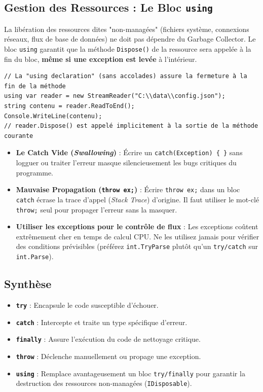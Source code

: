 \subsection{Gestion des Ressources : Le Bloc \texttt{using}}

La libération des ressources dites "non-managées" (fichiers système, connexions réseaux, flux de base de données) ne doit pas dépendre du Garbage Collector. Le bloc \texttt{using} garantit que la méthode \texttt{Dispose()} de la ressource sera appelée à la fin du bloc, \textbf{même si une exception est levée} à l'intérieur.

\begin{lstlisting}[style=csharpstyle]
// La "using declaration" (sans accolades) assure la fermeture à la fin de la méthode
using var reader = new StreamReader("C:\\data\\config.json");
string contenu = reader.ReadToEnd();
Console.WriteLine(contenu);
// reader.Dispose() est appelé implicitement à la sortie de la méthode courante
\end{lstlisting}

\begin{tcolorbox}[colback=backcolour,colframe=keywordcolor,title=\textbf{Pièges Courants \& Anti-Patterns}]
\begin{itemize}
    \item \textbf{Le Catch Vide (\textit{Swallowing})} : Écrire un \texttt{catch(Exception) \{ \}} sans logguer ou traiter l'erreur masque silencieusement les bugs critiques du programme.
    \item \textbf{Mauvaise Propagation (\texttt{throw ex;})} : Écrire \texttt{throw ex;} dans un bloc \texttt{catch} écrase la trace d'appel (\textit{Stack Trace}) d'origine. Il faut utiliser le mot-clé \texttt{throw;} seul pour propager l'erreur sans la masquer.
    \item \textbf{Utiliser les exceptions pour le contrôle de flux} : Les exceptions coûtent extrêmement cher en temps de calcul CPU. Ne les utilisez jamais pour vérifier des conditions prévisibles (préférez \texttt{int.TryParse} plutôt qu'un \texttt{try/catch} sur \texttt{int.Parse}).
\end{itemize}
\end{tcolorbox}

\subsection{Synthèse}
\begin{itemize}
    \item \textbf{\texttt{try}} : Encapsule le code susceptible d'échouer.
    \item \textbf{\texttt{catch}} : Intercepte et traite un type spécifique d'erreur.
    \item \textbf{\texttt{finally}} : Assure l'exécution du code de nettoyage critique.
    \item \textbf{\texttt{throw}} : Déclenche manuellement ou propage une exception.
    \item \textbf{\texttt{using}} : Remplace avantageusement un bloc \texttt{try/finally} pour garantir la destruction des ressources non-managées (\texttt{IDisposable}).
\end{itemize}
